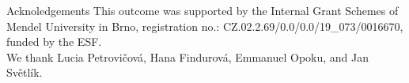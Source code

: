 \documentclass[final]{beamer}
\newlength{\sepwidth}
\newlength{\colwidth}
\newcommand{\separatorcolumn}{\begin{column}{\sepwidth}\end{column}}
\begin{document}
\begin{frame}[t]
\begin{columns}[t]
\begin{column}{\colwidth}
\end{column}
\end{columns}

\begin{columns}[c]
\begin{column}{0.96\paperwidth}

\begin{block}{Acknoledgements}
\small \centering
    This outcome was supported by the Internal Grant Schemes of Mendel University in Brno, registration no.: CZ.02.2.69/0.0/0.0/19\_073/0016670, funded by the ESF. \\
    We thank Lucia Petrovičová, Hana Findurová, Emmanuel Opoku, and Jan Světlík.
\end{block}

\end{column}
%
%
\end{columns}
\end{frame}
\end{document}
